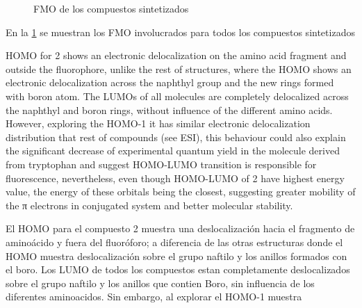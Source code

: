 \begin{figure}
    \centering
    \label{fig:FMO}
    \caption{\gls{FMO} de los compuestos sintetizados}
\end{figure}

En la \cref{fig:FMO} se muestran los \gls{FMO} involucrados para todos los compuestos sintetizados

HOMO for 2 shows an electronic delocalization on the amino acid fragment and outside the fluorophore, unlike the rest of structures, where the HOMO shows an electronic delocalization across the naphthyl group and the new rings formed with boron atom. The LUMOs of all molecules are completely delocalized across the naphthyl and boron rings, without influence of the different amino acids. However, exploring the HOMO-1 it has similar electronic delocalization distribution that rest of compounds (see ESI), this behaviour could also explain the significant decrease of experimental quantum yield in the molecule derived from tryptophan and suggest HOMO-LUMO transition is responsible for fluorescence, nevertheless, even though HOMO-LUMO of 2 have highest energy value, the energy of these orbitals being the closest, suggesting greater mobility of the π electrons in conjugated system and better molecular stability.

El \gls{HOMO} para el compuesto 2 muestra una deslocalización hacia el fragmento de aminoácido y fuera del fluoróforo; a diferencia de las otras estructuras donde el \gls{HOMO} muestra deslocalización sobre el grupo naftilo y los anillos formados con el boro.
Los \gls{LUMO} de todos los compuestos estan completamente deslocalizados sobre el grupo naftilo y los anillos que contien Boro, sin influencia de los diferentes aminoacidos. Sin embargo, al explorar el \gls{HOMO}-1 muestra 
